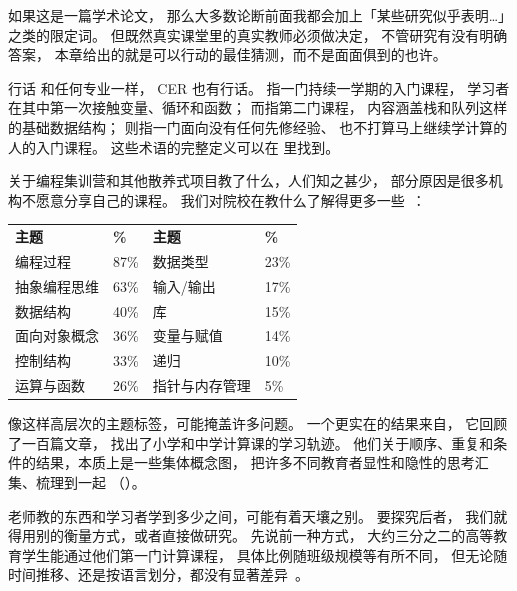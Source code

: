 如果这是一篇学术论文，
那么大多数论断前面我都会加上「某些研究似乎表明{\ldots}」之类的限定词。
但既然真实课堂里的真实教师必须做决定，
不管研究有没有明确答案，
本章给出的就是可以行动的最佳猜测，而不是面面俱到的也许。

\begin{aside}{行话}
  和任何专业一样，
  CER 也有行话。
  指一门持续一学期的入门课程，
  学习者在其中第一次接触变量、循环和函数；
  而指第二门课程，
  内容涵盖栈和队列这样的基础数据结构；
  则指一门面向没有任何先修经验、
  也不打算马上继续学计算的人的入门课程。
  这些术语的完整定义可以在
  里找到。
\end{aside}


关于编程集训营和其他散养式项目教了什么，人们知之甚少，
部分原因是很多机构不愿意分享自己的课程。
我们对院校在教什么了解得更多一些~\cite{Luxt2017}：

\begin{longtable}{llll}
\textbf{主题}&	\textbf{\%}&	\textbf{主题}&	\textbf{\%}	\\
编程过程	&	87\%&	数据类型	&	23\%	\\
抽象编程思维&	63\%&	输入/输出	&	17\%	\\
数据结构	&	40\%&	库	&	15\%	\\
面向对象概念	&	36\%&	变量与赋值	&	14\%	\\
控制结构	&	33\%&	递归	&	10\%	\\
运算与函数	&	26\%&	指针与内存管理&	5\%
\end{longtable}

像这样高层次的主题标签，可能掩盖许多问题。
一个更实在的结果来自\cite{Rich2017}，
它回顾了一百篇文章，
找出了小学和中学计算课的学习轨迹。
他们关于顺序、重复和条件的结果，本质上是一些集体概念图，
把许多不同教育者显性和隐性的思考汇集、梳理到一起
（）。

\newpage
{}


老师教的东西和学习者学到多少之间，可能有着天壤之别。
要探究后者，
我们就得用别的衡量方式，或者直接做研究。
先说前一种方式，
大约三分之二的高等教育学生能通过他们第一门计算课程，
具体比例随班级规模等有所不同，
但无论随时间推移、还是按语言划分，都没有显著差异~\cite{Benn2007a,Wats2014}。

